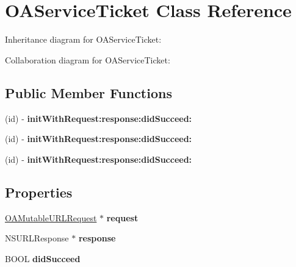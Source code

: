 \hypertarget{interface_o_a_service_ticket}{
\section{\-O\-A\-Service\-Ticket \-Class \-Reference}
\label{interface_o_a_service_ticket}
}


\-Inheritance diagram for \-O\-A\-Service\-Ticket\-:


\-Collaboration diagram for \-O\-A\-Service\-Ticket\-:
\subsection*{\-Public \-Member \-Functions}
\begin{DoxyCompactItemize}
\item 
\hypertarget{interface_o_a_service_ticket_a3e172a4f1c3da71a0dc45381e5a7170f}{
(id) -\/ {\bfseries init\-With\-Request\-:response\-:did\-Succeed\-:}}
\label{interface_o_a_service_ticket_a3e172a4f1c3da71a0dc45381e5a7170f}

\item 
\hypertarget{interface_o_a_service_ticket_a3e172a4f1c3da71a0dc45381e5a7170f}{
(id) -\/ {\bfseries init\-With\-Request\-:response\-:did\-Succeed\-:}}
\label{interface_o_a_service_ticket_a3e172a4f1c3da71a0dc45381e5a7170f}

\item 
\hypertarget{interface_o_a_service_ticket_a3e172a4f1c3da71a0dc45381e5a7170f}{
(id) -\/ {\bfseries init\-With\-Request\-:response\-:did\-Succeed\-:}}
\label{interface_o_a_service_ticket_a3e172a4f1c3da71a0dc45381e5a7170f}

\end{DoxyCompactItemize}
\subsection*{\-Properties}
\begin{DoxyCompactItemize}
\item 
\hypertarget{interface_o_a_service_ticket_a3af8fca4660fe9c6ea96d71a47670bbc}{
\hyperlink{interface_o_a_mutable_u_r_l_request}{\-O\-A\-Mutable\-U\-R\-L\-Request} $\ast$ {\bfseries request}}
\label{interface_o_a_service_ticket_a3af8fca4660fe9c6ea96d71a47670bbc}

\item 
\hypertarget{interface_o_a_service_ticket_ab9bccadc526156682c4910011f425f05}{
\-N\-S\-U\-R\-L\-Response $\ast$ {\bfseries response}}
\label{interface_o_a_service_ticket_ab9bccadc526156682c4910011f425f05}

\item 
\hypertarget{interface_o_a_service_ticket_a6a025926126aff333006926c7538d1d8}{
\-B\-O\-O\-L {\bfseries did\-Succeed}}
\label{interface_o_a_service_ticket_a6a025926126aff333006926c7538d1d8}

\end{DoxyCompactItemize}


